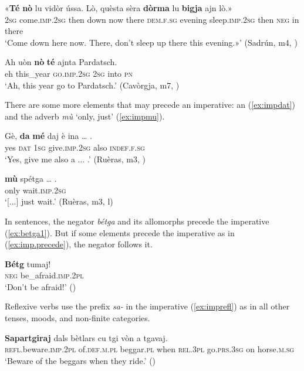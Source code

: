 \ea
\label{ex:imp.precede}
\gll «\textbf{Té} \textbf{nò} lu vidòr ússa. Lò, quèsta sèra \textbf{dòrma} lu \textbf{bigja} ajn lò.»\\
\textsc{2sg} come.\textsc{imp.2sg} then down now there  \textsc{dem.f.sg} evening sleep.\textsc{imp.2sg} then \textsc{neg} in there\\
\glt `Come down here now. There, don’t sleep up there this evening.»' (Sadrún, m4, )
\z

\ea
\label{ex:imp.follow}
	\gll  Ah uòn \textbf{nò} \textbf{té} ajnta Pardatsch.\\
eh this\_year \textsc{go.imp.2sg} \textsc{2sg} into \textsc{pn}\\
\glt `Ah, this year go to Pardatsch.' (Cavòrgja, m7, )
\z

There are some more elements that may precede an imperative: an  (\ref{ex:impdat}) and the adverb \textit{mù} `only, just' (\ref{ex:impmu}).

\ea
\label{ex:impdat}
\gll Gè, \textbf{da} \textbf{mé} daj è ina … . \\
yes \textsc{dat} \textsc{1sg} give.\textsc{imp.2sg} also \textsc{indef.f.sg} \\ 
\glt `Yes, give me also a ... .' (Ruèras, m3, )
\z

\ea
\label{ex:impmu}
\gll [...] \textbf{mù} spétga … .\\
{} only wait.\textsc{imp.2sg}\\
\glt `[...] just wait.' (Ruèras, m3, l)
\z


In  sentences, the negator \textit{bétga} and its allomorphs precede the imperative (\ref{ex:betga1}). But if some elements precede the imperative as in (\ref{ex:imp.precede}), the negator follows it.

\ea
\label{ex:betga1}
\gll  \textbf{Bétg} tumaj!\\
\textsc{neg} be\_afraid.\textsc{imp.2pl}\\
\glt `Don’t be afraid!' ()
\z

Reflexive verbs use the prefix \textit{sa-} in the imperative (\ref{ex:imprefl}) as in all other tenses, moods, and non-finite categories.

\ea
\label{ex:imprefl}
\gll  \textbf{Sapartgiraj} dals bètlars cu tgi vòn a tgavaj.  \\
\textsc{refl}.beware.\textsc{imp.2pl} of.\textsc{def.m.pl} beggar.\textsc{pl} when \textsc{rel.3pl} go.\textsc{prs.3sg} on horse.\textsc{m.sg}\\
\glt `Beware of the beggars when they ride.' ()
\z

